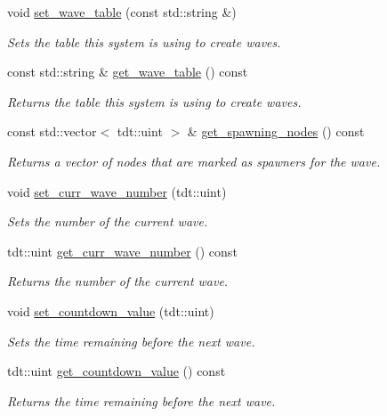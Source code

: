\begin{DoxyCompactItemize}
void \hyperlink{class_wave_system_ab983f35629a29a6b7fe407001c14b0be}{set\+\_\+wave\+\_\+table} (const std\+::string \&)
\begin{DoxyCompactList}\small\item\em Sets the table this system is using to create waves. \end{DoxyCompactList}\item 
const std\+::string \& \hyperlink{class_wave_system_aa5d62ed61dc416829d052f225eb8f4a7}{get\+\_\+wave\+\_\+table} () const 
\begin{DoxyCompactList}\small\item\em Returns the table this system is using to create waves. \end{DoxyCompactList}\item 
const std\+::vector$<$ tdt\+::uint $>$ \& \hyperlink{class_wave_system_a22da39953a79e71915e15c2515b07550}{get\+\_\+spawning\+\_\+nodes} () const 
\begin{DoxyCompactList}\small\item\em Returns a vector of nodes that are marked as spawners for the wave. \end{DoxyCompactList}\item 
void \hyperlink{class_wave_system_a91988914db2f2d6bf3ce4e6efbc6c00a}{set\+\_\+curr\+\_\+wave\+\_\+number} (tdt\+::uint)
\begin{DoxyCompactList}\small\item\em Sets the number of the current wave. \end{DoxyCompactList}\item 
tdt\+::uint \hyperlink{class_wave_system_a7bf5631871f34d83341b5ec881906ba7}{get\+\_\+curr\+\_\+wave\+\_\+number} () const 
\begin{DoxyCompactList}\small\item\em Returns the number of the current wave. \end{DoxyCompactList}\item 
void \hyperlink{class_wave_system_aa02519f3d7c79a5d020ceaf7ad82b341}{set\+\_\+countdown\+\_\+value} (tdt\+::uint)
\begin{DoxyCompactList}\small\item\em Sets the time remaining before the next wave. \end{DoxyCompactList}\item 
tdt\+::uint \hyperlink{class_wave_system_af667048a9cd9373137eaef4837eb344e}{get\+\_\+countdown\+\_\+value} () const 
\begin{DoxyCompactList}\small\item\em Returns the time remaining before the next wave. \end{DoxyCompactList}\item 

\end{DoxyCompactItemize}
